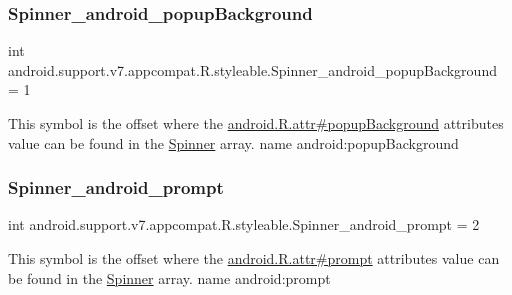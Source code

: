 \subsubsection{\texorpdfstring{Spinner\+\_\+android\+\_\+popup\+Background}{Spinner\_android\_popupBackground}}
{\footnotesize\ttfamily int android.\+support.\+v7.\+appcompat.\+R.\+styleable.\+Spinner\+\_\+android\+\_\+popup\+Background = 1\hspace{0.3cm}{\ttfamily [static]}}

This symbol is the offset where the \hyperlink{}{android.\+R.\+attr\#popup\+Background} attribute\textquotesingle{}s value can be found in the \hyperlink{classandroid_1_1support_1_1v7_1_1appcompat_1_1R_1_1styleable_a63a8e6de3d44afcd176eaa79214fd8a5}{Spinner} array.  name android\+:popup\+Background \mbox{\label{classandroid_1_1support_1_1v7_1_1appcompat_1_1R_1_1styleable_ab4f59c7bdece7629eb5ff24a1cb7e934}} 
\subsubsection{\texorpdfstring{Spinner\+\_\+android\+\_\+prompt}{Spinner\_android\_prompt}}
{\footnotesize\ttfamily int android.\+support.\+v7.\+appcompat.\+R.\+styleable.\+Spinner\+\_\+android\+\_\+prompt = 2\hspace{0.3cm}{\ttfamily [static]}}

This symbol is the offset where the \hyperlink{}{android.\+R.\+attr\#prompt} attribute\textquotesingle{}s value can be found in the \hyperlink{classandroid_1_1support_1_1v7_1_1appcompat_1_1R_1_1styleable_a63a8e6de3d44afcd176eaa79214fd8a5}{Spinner} array.  name android\+:prompt \mbox{\label{classandroid_1_1support_1_1v7_1_1appcompat_1_1R_1_1styleable_abc081afdc0bd846ad86fc722e41e48db}} 
